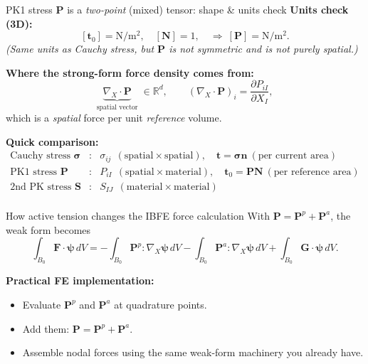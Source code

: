 \documentclass[aspectratio=169]{beamer}
\newcommand{\Gext}{\bm{G}}         %
\newcommand{\Pten}{\bm{P}}        %
\newcommand{\FLag}{\bm{F}}       %
\begin{document}
\begin{frame}{PK1 stress \(\mathbf{P}\) is a \emph{two-point} (mixed) tensor: shape \& units check}
\small
\medskip
\textbf{Units check (3D):}
\[
[\mathbf{t}_0]=\mathrm{N/m^2},\quad [\mathbf{N}]=1,\quad \Rightarrow\ [\mathbf{P}]=\mathrm{N/m^2}.
\]
\textit{(Same units as Cauchy stress, but \(\mathbf{P}\) is not symmetric and is not purely spatial.)}

\medskip
\textbf{Where the strong-form force density comes from:}
\[
\underbrace{\nabla_{\!X}\cdot \mathbf{P}}_{\text{spatial vector}}\;\in\mathbb{R}^d,
\qquad
\left(\nabla_{\!X}\cdot \mathbf{P}\right)_i=\frac{\partial P_{iI}}{\partial X_I},
\]
which is a \emph{spatial} force per unit \emph{reference} volume.

\medskip
\textbf{Quick comparison:}
\[
\begin{array}{lll}
\text{Cauchy stress } \boldsymbol{\sigma} & : & \sigma_{ij}\ \ (\text{spatial}\times\text{spatial}),\quad \mathbf{t}=\boldsymbol{\sigma}\mathbf{n}\ (\text{per current area})\\[2pt]
\text{PK1 stress } \mathbf{P} & : & P_{iI}\ \ (\text{spatial}\times\text{material}),\quad \mathbf{t}_0=\mathbf{P}\mathbf{N}\ (\text{per reference area})\\[2pt]
\text{2nd PK stress } \mathbf{S} & : & S_{IJ}\ \ (\text{material}\times\text{material})\\
\end{array}
\]
\end{frame}




\begin{frame}{How active tension changes the IBFE force calculation}
\small
With \(\Pten=\Pten^{p}+\Pten^{a}\), the weak form becomes
\[
\int_{B_0} \FLag\cdot\bm{\psi}\,dV
=
-\int_{B_0} \Pten^{p}:\nabla_{\!X}\bm{\psi}\,dV
-\int_{B_0} \Pten^{a}:\nabla_{\!X}\bm{\psi}\,dV
+\int_{B_0} \Gext\cdot\bm{\psi}\,dV.
\]

\medskip
\textbf{Practical FE implementation:}
\begin{itemize}
\item Evaluate \(\Pten^{p}\) and \(\Pten^{a}\) at quadrature points.
\item Add them: \(\Pten=\Pten^{p}+\Pten^{a}\).
\item Assemble nodal forces using the same weak-form machinery you already have.
\end{itemize}
\end{frame}
\end{document}
